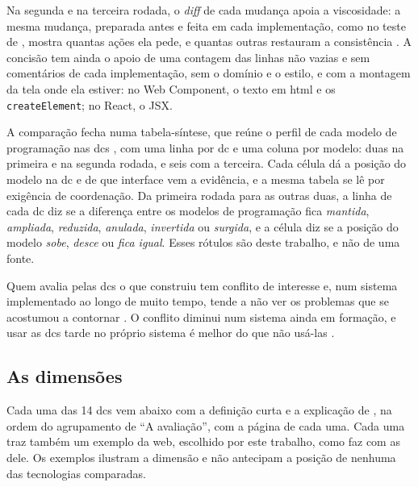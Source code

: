 Na segunda e na terceira rodada, o \emph{diff} de cada mudança apoia a
viscosidade: a mesma mudança, preparada antes e feita em cada
implementação, como no teste de \textcite[p. 162]{green1996d}, mostra
quantas ações ela pede, e quantas outras restauram a consistência
\cite[p. 115]{blackwell2003}.
A concisão tem ainda o apoio de uma contagem das linhas não vazias e
sem comentários de cada implementação, sem o domínio e o estilo, e com
a montagem da tela onde ela estiver: no Web Component, o texto em
\gls{html} e os \texttt{createElement}; no React, o JSX.

A comparação fecha numa tabela-síntese, que reúne o perfil de cada
modelo de programação nas \glspl{dc} \cite[p. 107-108 e 118]{blackwell2003},
com uma linha por \gls{dc} e uma coluna por modelo: duas na primeira e
na segunda rodada, e seis com a terceira.
Cada célula dá a posição do modelo na \gls{dc} e de que interface vem a
evidência, e a mesma tabela se lê por exigência de coordenação.
Da primeira rodada para as outras duas, a linha de cada \gls{dc} diz se
a diferença entre os modelos de programação fica \emph{mantida},
\emph{ampliada}, \emph{reduzida}, \emph{anulada}, \emph{invertida} ou \emph{surgida}, e a célula
diz se a posição do modelo \emph{sobe}, \emph{desce} ou \emph{fica igual}.
Esses rótulos são deste trabalho, e não de uma fonte.

Quem avalia pelas \glspl{dc} o que construiu tem conflito de
interesse e, num sistema implementado ao longo de muito tempo, tende a não
ver os problemas que se acostumou a contornar \cite{dagit2006}.
O conflito diminui num sistema ainda em formação, e usar as \glspl{dc}
tarde no próprio sistema é melhor do que não usá-las \cite{dagit2006}.
\subsection{As dimensões}
\label{sec:as-dimensoes}
Cada uma das 14 \glspl{dc} vem abaixo com a definição curta e a
explicação de \textcite[p. 115-118]{blackwell2003}, na ordem do
agrupamento de “A avaliação”, com a página de cada uma.
Cada uma traz também um exemplo da web, escolhido por este trabalho,
como \textcite[p. 12-14]{kiss2014} faz com as dele.
Os exemplos ilustram a dimensão e não antecipam a posição de nenhuma
das tecnologias comparadas.

